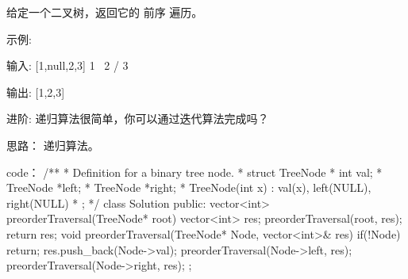 给定一个二叉树，返回它的 前序 遍历。

 示例:

输入: [1,null,2,3]  
   1
    \
     2
    /
   3 

输出: [1,2,3]

进阶: 递归算法很简单，你可以通过迭代算法完成吗？































思路：
递归算法。




























code：
/**
 * Definition for a binary tree node.
 * struct TreeNode {
 *     int val;
 *     TreeNode *left;
 *     TreeNode *right;
 *     TreeNode(int x) : val(x), left(NULL), right(NULL) {}
 * };
 */
class Solution {
public:
    vector<int> preorderTraversal(TreeNode* root) {
        vector<int> res;
        preorderTraversal(root, res);
        return res;
    }
    void preorderTraversal(TreeNode* Node, vector<int>& res)
    {
        if(!Node) return;
        res.push_back(Node->val);
        preorderTraversal(Node->left, res);
        preorderTraversal(Node->right, res);
    }
};